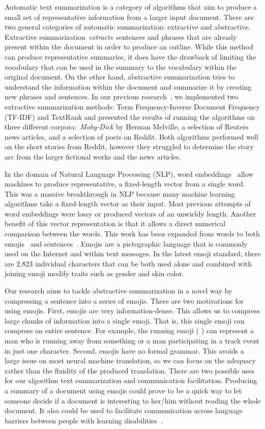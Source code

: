 \documentclass{article}[10]
\newcommand*{\img}[1]{%
  \raisebox{-.3\baselineskip}{%
    \texttt{[image: \#1]}%
  }%
}
\begin{document}
Automatic text summarization is a category of algorithms that aim to
produce a small set of representative information from a larger input
document. There are two general categories of automatic summarization:
extractive and abstractive. Extractive
summarization~\emph{extracts~}sentences and phrases that are already
present within the document in order to produce an outline. While this
method can produce representative summaries, it does have the drawback
of limiting the vocabulary that can be used in the summary to the
vocabulary within the original document. On the other hand, abstractive
summarization tries to understand the information within the document
and summarize it by creating new phrases and sentences. In our previous
research~\cite{day_extractive}, we implemented two extractive summarization
methods: Term Frequency-Inverse Document Frequency (TF-IDF) and TextRank
and presented the results of running the algorithms on three different
corpora:~\emph{Moby-Dick} by Herman Melville, a selection of Reuters news
articles, and a selection of posts on Reddit. Both algorithms performed
well on the short stories from Reddit, however they struggled to
determine the story arc from the larger fictional works and the news
articles.


In the domain of Natural Language Processing (NLP), word
embeddings~\cite{mikolov2013efficient} allow machines to produce representative,
a fixed-length vector from a single word. This was a massive
breakthrough in NLP because many machine
learning algorithms take a fixed-length vector as their input. Most
previous attempts of word embeddings were lossy or produced vectors of
an unwieldy length. Another benefit of this vector representation is
that it allows a direct numerical comparison between the words. This
work has been expanded from words to both emojis~\cite{Eisner_2016}
and sentences~\cite{pg2017unsu}. Emojis are a
pictographic language that is commonly used on the Internet and within
text messages. In the latest emoji
standard, there are 2,823 individual characters that can be both used alone and
combined with joining emoji modify traits such as gender and skin color.

Our research aims to tackle abstractive summarization in a novel way by
compressing a sentence into a series of emojis. There are two motivations for
using emojis. First, emojis are very information-dense. This allows us to
compress large chunks of information into a single emoji. That is, this single
emoji can compress an entire sentence. For example, the running emoji (\img{emojis/1f3c3.png}) can represent a man who is running away from something
or a man participating in a track event in just one
character. Second, emojis have no formal grammar. This avoids a large issue on most
neural machine translation, so we can focus on the adequacy rather than
the fluidity of the produced translation. There are two possible uses
for our algorithm text summarization and communication facilitation.
Producing a summary of a document using emojis could prove to be a
quick way to let someone decide if a document is interesting to her/him
without reading the whole document. It also could be used to facilitate
communication across language barriers between people with learning
disabilities~\cite{vandeghinste2017translating}.
\end{document}
